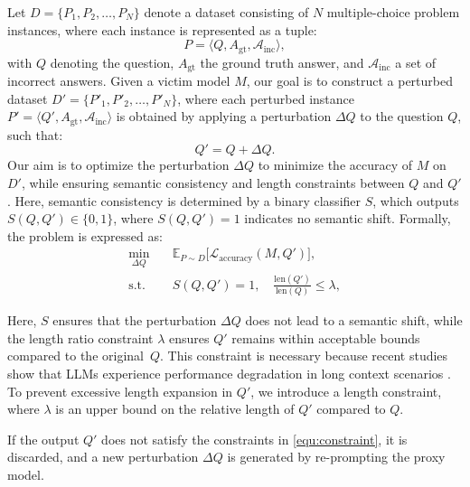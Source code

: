 Let \( D = \{P_1, P_2, \dots, P_N\} \) denote a dataset consisting of \( N \) multiple-choice problem instances, where each instance is represented as a tuple:
\begin{equation}
    P = \langle Q, A_\text{gt}, \mathcal{A}_\text{inc} \rangle,
\end{equation}
with \( Q \) denoting the question, \( A_\text{gt} \) the ground truth answer, and \( \mathcal{A}_\text{inc} \) a set of incorrect answers. Given a victim model \( M \), our goal is to construct a perturbed dataset \( D' = \{P'_1, P'_2, \dots, P'_N\} \), where each perturbed instance \( P' = \langle Q', A_\text{gt}, \mathcal{A}_\text{inc} \rangle \) is obtained by applying a perturbation \( \Delta Q \) to the question \( Q \), such that:
\begin{equation}
\label{equ:Q}
Q' = Q + \Delta Q.
\end{equation}
Our  aim is to optimize the perturbation \( \Delta Q \) to minimize the accuracy of \( M \) on \( D' \), while ensuring semantic consistency and length constraints between \( Q \) and \( Q' \). Here, semantic consistency is determined by a binary classifier \( S \), which outputs \( S(Q, Q') \in \{0, 1\} \), where \( S(Q, Q') = 1 \) indicates no semantic shift. Formally, the problem is expressed as:
\begin{equation}
\label{equ:constraint}
\begin{aligned}
\min_{\Delta Q} & \quad \mathbb{E}_{P \sim D} \Big[ \mathcal{L}_\text{accuracy}(M, Q') \Big], \\
\text{s.t.} & \quad S(Q, Q') = 1, \quad \frac{\text{len}(Q')}{\text{len}(Q)} \leq \lambda,
\end{aligned}
\end{equation}

Here, \( S \) ensures that the perturbation \( \Delta Q \) does not lead to a semantic shift, while the length ratio constraint \(\lambda\) ensures \( Q' \) remains within acceptable bounds compared to the original~\( Q \). This   constraint is necessary  because  recent studies show that LLMs experience performance degradation in long context scenarios \citep{bai2023longbench}.  To  prevent excessive length expansion in  $Q'$, we introduce a length constraint, where \( \lambda \) is an upper bound on the relative length of \( Q' \) compared to \( Q \).

If the output \( Q' \) does not satisfy the constraints in \autoref{equ:constraint}, it is discarded, and a new perturbation \( \Delta Q \) is generated by re-prompting the proxy model.

